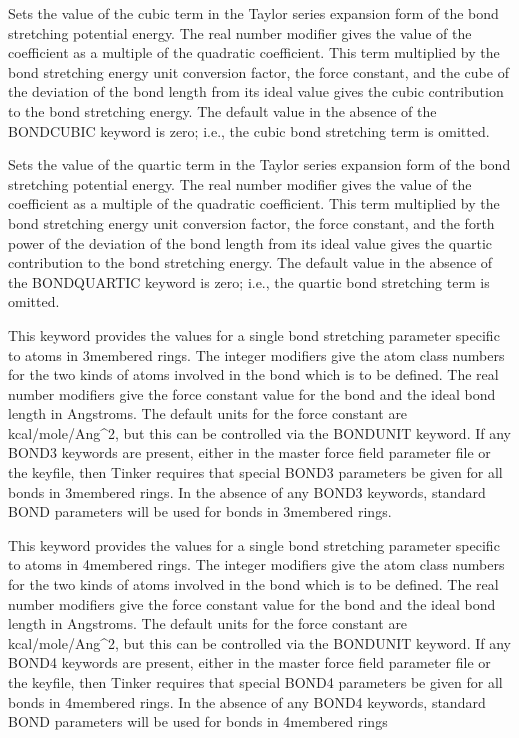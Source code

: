 \documentclass[letterpaper,11pt,english]{sphinxmanual}
\begin{document}
  Sets the value of the cubic term in the Taylor series expansion form of the bond stretching potential energy. The real number modifier gives the value of the coefficient as a multiple of the quadratic coefficient. This term multiplied by the bond stretching energy unit conversion factor, the force constant, and the cube of the deviation of the bond length from its ideal value gives the cubic contribution to the bond stretching energy. The default value in the absence of the BOND\sphinxhyphen{}CUBIC keyword is zero; i.e., the cubic bond stretching term is omitted.

  Sets the value of the quartic term in the Taylor series expansion form of the bond stretching potential energy. The real number modifier gives the value of the coefficient as a multiple of the quadratic coefficient. This term multiplied by the bond stretching energy unit conversion factor, the force constant, and the forth power of the deviation of the bond length from its ideal value gives the quartic contribution to the bond stretching energy. The default value in the absence of the BOND\sphinxhyphen{}QUARTIC keyword is zero; i.e., the quartic bond stretching term is omitted.

  This keyword provides the values for a single bond stretching parameter specific to atoms in 3\sphinxhyphen{}membered rings. The integer modifiers give the atom class numbers for the two kinds of atoms involved in the bond which is to be defined. The real number modifiers give the force constant value for the bond and the ideal bond length in Angstroms. The default units for the force constant are kcal/mole/Ang\textasciicircum{}2, but this can be controlled via the BONDUNIT keyword. If any BOND3 keywords are present, either in the master force field parameter file or the keyfile, then Tinker requires that special BOND3 parameters be given for all bonds in 3\sphinxhyphen{}membered rings. In the absence of any BOND3 keywords, standard BOND parameters will be used for bonds in 3\sphinxhyphen{}membered rings.

  This keyword provides the values for a single bond stretching parameter specific to atoms in 4\sphinxhyphen{}membered rings. The integer modifiers give the atom class numbers for the two kinds of atoms involved in the bond which is to be defined. The real number modifiers give the force constant value for the bond and the ideal bond length in Angstroms. The default units for the force constant are kcal/mole/Ang\textasciicircum{}2, but this can be controlled via the BONDUNIT keyword. If any BOND4 keywords are present, either in the master force field parameter file or the keyfile, then Tinker requires that special BOND4 parameters be given for all bonds in 4\sphinxhyphen{}membered rings. In the absence of any BOND4 keywords, standard BOND parameters will be used for bonds in 4\sphinxhyphen{}membered rings
\end{document}
